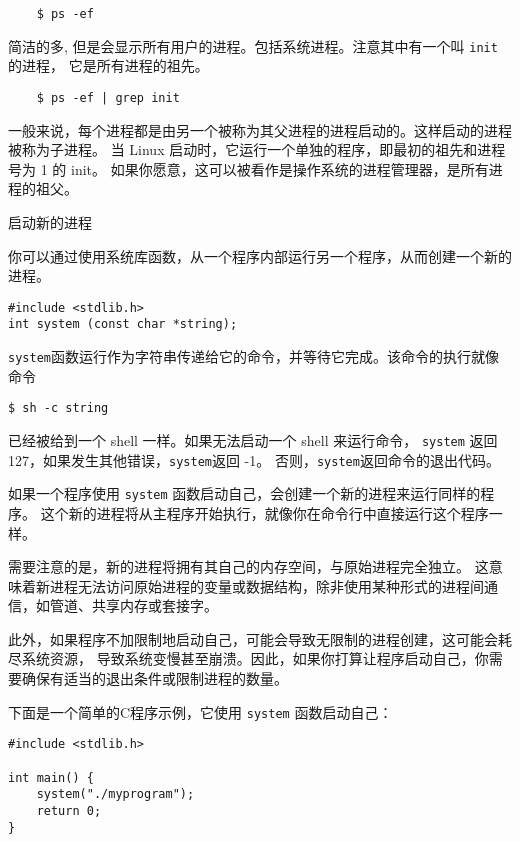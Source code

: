 \documentclass{ctexart}
\begin{document}
\begin{verbatim}
    $ ps -ef
\end{verbatim}
简洁的多, 但是会显示所有用户的进程。包括系统进程。注意其中有一个叫 \texttt{init} 的进程，
它是所有进程的祖先。

\begin{verbatim}
    $ ps -ef | grep init
\end{verbatim}

一般来说，每个进程都是由另一个被称为其父进程的进程启动的。这样启动的进程被称为子进程。
当 Linux 启动时，它运行一个单独的程序，即最初的祖先和进程号为 1 的 init。
如果你愿意，这可以被看作是操作系统的进程管理器，是所有进程的祖父。

启动新的进程  
  
你可以通过使用系统库函数，从一个程序内部运行另一个程序，从而创建一个新的进程。  
  
\begin{verbatim}  
#include <stdlib.h>  
int system (const char *string);  
\end{verbatim}  
  
\texttt{system}函数运行作为字符串传递给它的命令，并等待它完成。该命令的执行就像命令  
  
\begin{verbatim}  
$ sh -c string  
\end{verbatim}  
  
已经被给到一个 shell 一样。如果无法启动一个 shell 来运行命令，
\texttt{system} 返回 127，如果发生其他错误，\texttt{system}返回 -1。
否则，\texttt{system}返回命令的退出代码。  

如果一个程序使用 \texttt{system} 函数启动自己，会创建一个新的进程来运行同样的程序。
这个新的进程将从主程序开始执行，就像你在命令行中直接运行这个程序一样。  
  
需要注意的是，新的进程将拥有其自己的内存空间，与原始进程完全独立。
这意味着新进程无法访问原始进程的变量或数据结构，除非使用某种形式的进程间通信，如管道、共享内存或套接字。  
  
此外，如果程序不加限制地启动自己，可能会导致无限制的进程创建，这可能会耗尽系统资源，
导致系统变慢甚至崩溃。因此，如果你打算让程序启动自己，你需要确保有适当的退出条件或限制进程的数量。  
  
下面是一个简单的C程序示例，它使用 \texttt{system} 函数启动自己：  
  
\begin{verbatim}  
#include <stdlib.h>  
  
int main() {  
    system("./myprogram");  
    return 0;  
}  
\end{verbatim}  
  
\end{document}
